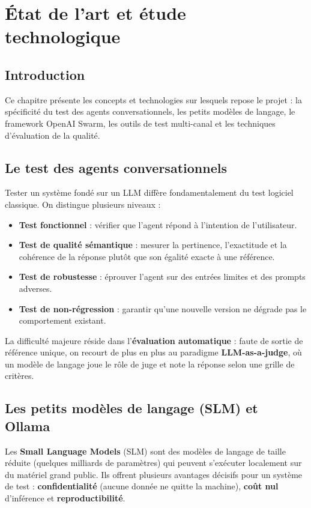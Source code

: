 \documentclass[12pt,a4paper,oneside]{report}
\begin{document}
\chapter{État de l'art et étude technologique}

\section{Introduction}
Ce chapitre présente les concepts et technologies sur lesquels repose le projet : la
spécificité du test des agents conversationnels, les petits modèles de langage, le
framework OpenAI Swarm, les outils de test multi-canal et les techniques d'évaluation
de la qualité.

\section{Le test des agents conversationnels}
Tester un système fondé sur un LLM diffère fondamentalement du test logiciel
classique. On distingue plusieurs niveaux :
\begin{itemize}[leftmargin=*]
  \item \textbf{Test fonctionnel} : vérifier que l'agent répond à l'intention de
  l'utilisateur.
  \item \textbf{Test de qualité sémantique} : mesurer la pertinence, l'exactitude et
  la cohérence de la réponse plutôt que son égalité exacte à une référence.
  \item \textbf{Test de robustesse} : éprouver l'agent sur des entrées limites et des
  prompts adverses.
  \item \textbf{Test de non-régression} : garantir qu'une nouvelle version ne dégrade
  pas le comportement existant.
\end{itemize}
La difficulté majeure réside dans l'\textbf{évaluation automatique} : faute de sortie
de référence unique, on recourt de plus en plus au paradigme \textbf{LLM-as-a-judge},
où un modèle de langage joue le rôle de juge et note la réponse selon une grille de
critères.

\section{Les petits modèles de langage (SLM) et Ollama}
Les \textbf{Small Language Models} (SLM) sont des modèles de langage de taille réduite
(quelques milliards de paramètres) qui peuvent s'exécuter localement sur du matériel
grand public. Ils offrent plusieurs avantages décisifs pour un système de test :
\textbf{confidentialité} (aucune donnée ne quitte la machine), \textbf{coût nul}
d'inférence et \textbf{reproductibilité}.
\end{document}
